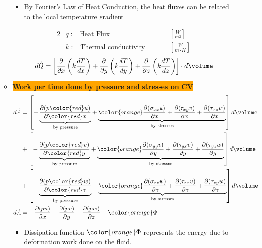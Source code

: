 \begin{itemize}
\begin{itemize}
        \begin{itemize}
            \item By Fourier's Law of Heat Conduction, the heat fluxes can be related to the local temperature gradient
        \end{itemize}
        \begin{alignat*}{2}
            & \dot{q} := \text{Heat Flux} \qquad &&\left[ \frac{W}{m^2} \right] \\
            & k := \text{Thermal conductivity} \qquad && \left[ \frac{W}{m\cdot K} \right]
        \end{alignat*}
        \begin{equation*}
            d\dot{Q} = \left[\frac{\partial}{\partial x}\left(k \frac{dT}{dx}\right) + \frac{\partial}{\partial y}\left(k \frac{dT}{dy}\right) + \frac{\partial}{\partial z}\left(k \frac{dT}{dz}\right)\right] \cdot d\volume
        \end{equation*}
        \item \colorbox{orange}{\textbf{\color{white}Work per time done by pressure and stresses on CV}} 
        \begin{align*}
            d\dot{A} &= \left[ - \underbrace{\frac{\partial (p {\color{red}u})}{\partial {\color{red}x}}}_{\text{by pressure}}+ \underbrace{\color{orange}\frac{\partial (\sigma_{xx} u)}{\partial x} + \frac{\partial (\tau_{xy} v)}{\partial x} + \frac{\partial (\tau_{xz} w)}{\partial x}}_{\text{by stresses}} \right] d\volume \\
            &+\left[ - \underbrace{\frac{\partial (p {\color{red}v})}{\partial {\color{red}y}}}_{\text{by pressure}}+ \underbrace{\color{orange}\frac{\partial (\sigma_{yy} v)}{\partial y} + \frac{\partial (\tau_{yx} v)}{\partial y} + \frac{\partial (\tau_{yz} w)}{\partial y}}_{\text{by stresses}} \right] d\volume \\
            &+\left[ - \underbrace{\frac{\partial (p {\color{red}w})}{\partial {\color{red}z}}}_{\text{by pressure}}+ \underbrace{\color{orange} \frac{\partial (\sigma_{zz} w)}{\partial z} + \frac{\partial (\tau_{zx} v)}{\partial z} + \frac{\partial (\tau_{zy} w)}{\partial z}}_{\text{by stresses}} \right] d\volume \\
            d\dot{A} &= - \frac{\partial (p u)}{\partial x} - \frac{\partial (p v)}{\partial y} - \frac{\partial (p w)}{\partial z} + {\color{orange}\Phi}
        \end{align*}
        \begin{itemize}
            \item Dissipation function ${\color{orange}\Phi}$ represents the energy due to deformation work done on the fluid.

\end{itemize}
\end{itemize}
\end{itemize}
